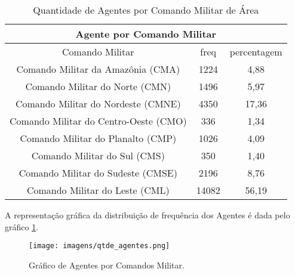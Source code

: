 \begin{table}[H]
\centering
\begin{tabular}{|c | c| c|} 
 \multicolumn{3}{c}{Agente por Comando Militar}\\ \hline
  Comando Militar & freq  & percentagem \\ [0.5ex] 
 \hline
 Comando Militar da Amazônia (CMA) &  1224 & 4,88\\ 
 \hline
 Comando Militar do Norte (CMN) &  1496 & 5,97\\
 \hline
 Comando Militar do Nordeste (CMNE) &  4350 & 17,36\\
 \hline
 Comando Militar do Centro-Oeste (CMO) &  336 & 1,34\\
 \hline
 Comando Militar do Planalto (CMP) &  1026 & 4,09\\
 \hline
 Comando Militar do Sul (CMS) &  350 & 1,40\\
 \hline
 Comando Militar do Sudeste (CMSE) &  2196 & 8,76\\
 \hline
 Comando Militar do Leste (CML) &  14082 & 56,19\\ [1ex] 
 \hline
\end{tabular}
\caption{Quantidade de Agentes por Comando Militar de Área}
\label{QuantidadeAgentes}
\end{table}

\hspace{1.5cm}
A representação gráfica da distribuição de frequência dos Agentes é dada pelo gráfico \ref{figuraAgentes}.
\begin{figure}[H]
        \centering
        \texttt{[image: imagens/qtde\_agentes.png]}
        \caption{Gráfico de Agentes por Comandos Militar.}
        \label{figuraAgentes}
\end{figure}

